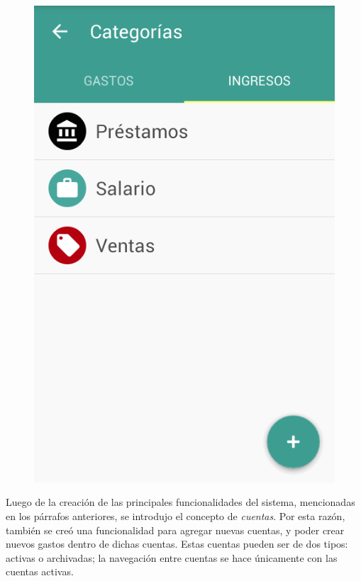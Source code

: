 \begin{figure}[ht]
\begin{minipage}{.5\textwidth}
  \includegraphics[scale=0.4,type=png,ext=.png,read=.png]{imagenes/income_categories}
  \captionsetup{justification=centering}
  \label{fig:interfazListarIncomeCategories}
\end{minipage}
\end{figure}

Luego de la creación de las principales funcionalidades del sistema, mencionadas en los párrafos anteriores, se introdujo el concepto de \textit{cuentas}. Por esta razón, también se creó una funcionalidad para agregar nuevas cuentas, y poder crear nuevos gastos dentro de dichas cuentas. Estas cuentas pueden ser de dos tipos: activas o archivadas; la navegación entre cuentas se hace únicamente con las cuentas activas. 

